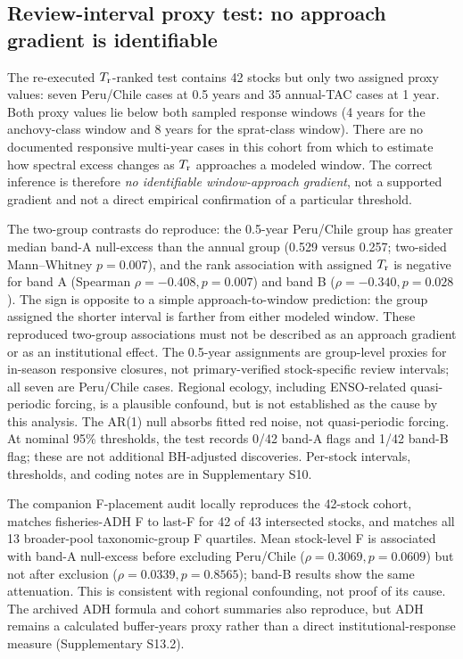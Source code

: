 \subsection{Review-interval proxy test: no approach gradient is identifiable}\label{sec:tr-results}

The re-executed \(T_{\mathrm r}\)-ranked test contains 42 stocks but only two assigned proxy values: seven Peru/Chile cases at 0.5 years and 35 annual-TAC cases at 1 year. Both proxy values lie below both sampled response windows (4 years for the anchovy-class window and 8 years for the sprat-class window). There are no documented responsive multi-year cases in this cohort from which to estimate how spectral excess changes as \(T_{\mathrm r}\) approaches a modeled window. The correct inference is therefore \emph{no identifiable window-approach gradient}, not a supported gradient and not a direct empirical confirmation of a particular threshold.

The two-group contrasts do reproduce: the 0.5-year Peru/Chile group has greater median band-A null-excess than the annual group (0.529 versus 0.257; two-sided Mann--Whitney \(p=0.007\)), and the rank association with assigned \(T_{\mathrm r}\) is negative for band A (Spearman \(\rho=-0.408, p=0.007\)) and band B (\(\rho=-0.340, p=0.028\)). The sign is opposite to a simple approach-to-window prediction: the group assigned the shorter interval is farther from either modeled window. These reproduced two-group associations must not be described as an approach gradient or as an institutional effect. The 0.5-year assignments are group-level proxies for in-season responsive closures, not primary-verified stock-specific review intervals; all seven are Peru/Chile cases. Regional ecology, including ENSO-related quasi-periodic forcing, is a plausible confound, but is not established as the cause by this analysis. The AR(1) null absorbs fitted red noise, not quasi-periodic forcing. At nominal 95\% thresholds, the test records 0/42 band-A flags and 1/42 band-B flag; these are not additional BH-adjusted discoveries. Per-stock intervals, thresholds, and coding notes are in Supplementary S10.

The companion F-placement audit locally reproduces the 42-stock cohort, matches fisheries-ADH F to last-F for 42 of 43 intersected stocks, and matches all 13 broader-pool taxonomic-group F quartiles. Mean stock-level F is associated with band-A null-excess before excluding Peru/Chile (\(\rho=0.3069,p=0.0609\)) but not after exclusion (\(\rho=0.0339,p=0.8565\)); band-B results show the same attenuation. This is consistent with regional confounding, not proof of its cause. The archived ADH formula and cohort summaries also reproduce, but ADH remains a calculated buffer-years proxy rather than a direct institutional-response measure (Supplementary S13.2).

